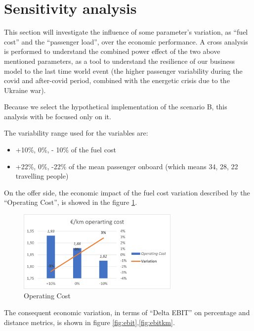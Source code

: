 \newpage
\section{Sensitivity analysis}
This section will investigate the influence of some parameter’s variation, as “fuel cost” and the “passenger load”, over the economic performance. A cross analysis is performed to understand the combined power effect of the two above mentioned parameters, as a tool to understand the resilience of our business model to the last time world event (the higher passenger variability during the covid and after-covid period, combined with the energetic crisis due to the Ukraine war).

Because we select the hypothetical implementation of the scenario B, this analysis with be focused only on it.

The variability range used for the variables are:
\begin{itemize}
    \item +10\%, 0\%, - 10\% of the fuel cost
    \item +22\%, 0\%, -22\% of the mean passenger onboard (which means 34, 28, 22 travelling people)
\end{itemize}

On the offer side, the economic impact of the fuel cost variation described by the “Operating Cost”, is showed in the figure \ref{fig:opercost}.

\begin{figure}[h]
    \centering
    \includegraphics[width=0.7\textwidth]{Images/financial/operating_cost.png}
    \caption{Operating Cost}
    \label{fig:opercost}
\end{figure}

The consequent economic variation, in terms of “Delta EBIT” on percentage and distance metrics, is shown in figure \ref{fig:ebit},\ref{fig:ebitkm}.

